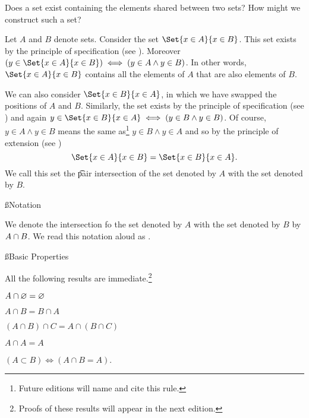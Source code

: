 

Does a set exist containing the elements shared between two sets?
How might we construct such a set?


Let $A$ and $B$ denote sets.
Consider the set $\Set{x \in A}{x \in B}$.
This set exists by the principle of specification (see ).
Moreover $(y \in \Set{x \in A}{x \in B}) \iff (y \in A \land y \in B)$.
In other words, $\Set{x \in A}{x \in B}$ contains all the elements of $A$ that are also elements of $B$.

We can also consider $\Set{x \in B}{x \in A}$, in which we have swapped the positions of $A$ and $B$.
Similarly, the set exists by the principle of specification (see ) and again $y \in \Set{x \in B}{x \in A} \iff (y \in B \land y \in B)$.
Of course, $y \in A \land y \in B$ means the same as\footnote{Future editions will name and cite this rule.} $y \in B \land y \in A$ and so by the principle of extension (see )
\[
	\Set{x \in A}{x \in B} = \Set{x \in B}{x \in A}.
\]
We call this set the \t{pair intersection} of the set denoted by $A$ with the set denoted by $B$.

\ss{Notation}

We denote the intersection fo the set denoted by $A$ with the set denoted by $B$ by $A \cap B$.
We read this notation aloud as .

\ss{Basic Properties}

All the following results are immediate.\footnote{Proofs of these results will appear in the next edition.}

\begin{proposition}
	$A \cap \varnothing = \varnothing$
\end{proposition}

\begin{proposition}[Commutativity]
	$A \cap B = B \cap A$
\end{proposition}

\begin{proposition}[Associativity]
	$(A \cap B) \cap C = A \cap (B \cap C)$
\end{proposition}

\begin{proposition}
	$A \cap A = A$
\end{proposition}

\begin{proposition}
	$(A \subset B) \iff (A \cap B = A)$.
\end{proposition}
